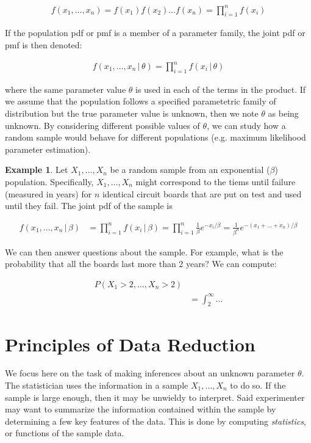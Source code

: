 \documentclass[11pt,a4paper]{report}
\theoremstyle{definition} \newtheorem{defn}{Definition}[section]
\theoremstyle{theorem} \newtheorem{thm}{Theorem}[section]
\theoremstyle{example} \newtheorem{ex}{Example}[section]
\begin{document}
\begin{align*} f(x_1, \dots, x_n) = f(x_1)f(x_2) \dots f(x_n) =
\prod_{i=1}^n f(x_i)
\end{align*}

If the population pdf or pmf is a member of a parameter family, the
joint pdf or pmf is then denoted:

\begin{align*} f(x_1, \dots, x_n \, | \, \theta) = \prod_{i=1}^n f(x_i
\, | \, \theta)
\end{align*}

where the same parameter value $\theta$ is used in each of the terms
in the product.  If we assume that the population follows a specified
parametetric family of distribution but the true parameter value is
unknown, then we note $\theta$ as being unknown.  By considering
different possible values of $\theta$, we can study how a random
sample would behave for different populations (e.g. maximum likelihood
parameter estimation).

\begin{ex} Let $X_1, \dots, X_n$ be a random sample from an
exponential ($\beta$) population.  Specifically, $X_1, \dots, X_n$
might correspond to the tiems until failure (measured in years) for
$n$ identical circuit boards that are put on test and used until they
fail.  The joint pdf of the sample is

  \begin{align*} f(x_1, \dots, x_n \, | \, \beta) &= \prod_{i=1}^n
f(x_i \, | \, \beta) = \prod_{i=1}^n \frac{1}{\beta} e^{-x_i / \beta}
= \frac{1}{\beta^n}e^{-(x_1 + \dots + x_n)/\beta}
  \end{align*}

  We can then answer questions about the sample.  For example, what is
the probability that all the boards last more than 2 years?  We can
compute:

  \begin{align*} P(X_1 > 2, \dots, X_n > 2) &\\ &= \int_2^{\infty}
\dots
  \end{align*}
\end{ex}

\chapter{Principles of Data Reduction}

We focus here on the task of making inferences about an unknown
parameter $\theta$.  The statistician uses the information in a sample
$X_1, \dots, X_n$ to do so.  If the sample is large enough, then it
may be unwieldy to interpret.  Said experimenter may want to summarize
the information contained within the sample by determining a few key
features of the data.  This is done by computing \textit{statistics},
or functions of the sample data.
\end{document}
